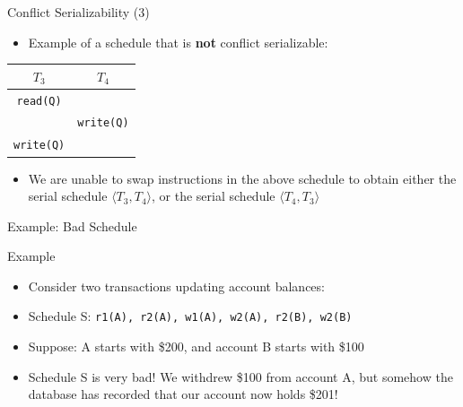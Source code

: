 \documentclass[aspectratio=169, xcolor=dvipsnames]{beamer}
\begin{document}
\begin{frame}{Conflict Serializability (3)}
    \begin{itemize}[<+->]
        \item Example of a schedule that is \textbf{not} conflict serializable:
    \end{itemize}
    \begin{center}
        \begin{tabular}{cc}
            $T_3$ & $T_4$ \\
            \midrule
            \texttt{read(Q)} & \\
             & \texttt{write(Q)} \\
            \texttt{write(Q)} & \\
        \end{tabular}
    \end{center}
    \begin{itemize}[<+->]
        \item We are unable to swap instructions in the above schedule to obtain either the serial schedule $\langle T_3, T_4 \rangle$, or the serial schedule $\langle T_4, T_3 \rangle$
    \end{itemize}
\end{frame}

\begin{frame}{Example: Bad Schedule}
    \begin{exampleblock}{Example}
        \begin{itemize}[<+->]
            \item Consider two transactions updating account balances:
            \item Schedule S: \texttt{r1(A), r2(A), w1(A), w2(A), r2(B), w2(B)}
            \item Suppose: A starts with \$200, and account B starts with \$100
        \end{itemize}
    \end{exampleblock}
    \begin{itemize}[<+->]
        \item Schedule S is very bad! We withdrew \$100 from account A, but somehow the database has recorded that our account now holds \$201!
    \end{itemize}
\end{frame}
\end{document}
